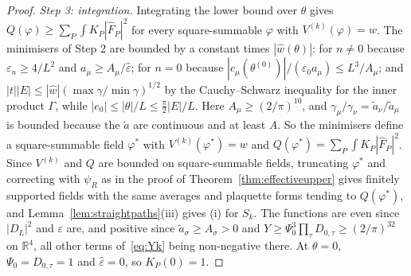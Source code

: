 \documentclass[11pt]{amsart}
\theoremstyle{definition}
\theoremstyle{remark}
\numberwithin{equation}{section}
\newcommand{\R}{\mathbb{R}}
\begin{document}
\begin{proof}
\emph{Step 3: integration.} Integrating the lower bound over $\theta$ gives
$Q(\varphi)\ge\sum_P\int K_P|\hat F_P|^2$ for every square-summable
$\varphi$ with $V^{(k)}(\varphi)=w$. The minimisers of Step 2 are bounded by
a constant times $|\hat w(\theta)|$: for $n\ne0$ because $\varepsilon_n\ge
4/L^2$ and $a_\mu\ge A_\mu/\hat\varepsilon$; for $n=0$ because
$|c_\mu(\theta^{(0)})|/(\varepsilon_0a_\mu)\le L^3/A_\mu$; and $|t||E|\le
|\hat w|(\max\gamma/\min\gamma)^{1/2}$ by the Cauchy--Schwarz inequality for
the inner product $\Gamma$, while $|e_0|\le|\theta|/L\le\frac\pi2|E|/L$.
Here $A_\mu\ge(2/\pi)^{10}$, and $\gamma_\mu/\gamma_\nu=\tilde a_\nu/
\tilde a_\mu$ is bounded because the $\tilde a$ are continuous and at least
$A$. So the minimisers define a square-summable field $\varphi^*$ with
$V^{(k)}(\varphi^*)=w$ and $Q(\varphi^*)=\sum_P\int K_P|\hat F_P|^2$.
Since $V^{(k)}$ and $Q$ are bounded on square-summable fields, truncating
$\varphi^*$ and correcting with $\psi_R$ as in the proof of
Theorem~\ref{thm:effectiveupper} gives finitely supported fields with the
same averages and plaquette forms tending to $Q(\varphi^*)$, and
Lemma~\ref{lem:straightpaths}(iii) gives (i) for $S_k$. The functions are
even since $|D_L|^2$ and $\varepsilon$ are, and positive since $\tilde
a_\sigma\ge A_\sigma>0$ and $Y\ge\Psi_0^3\prod_\tau D_{0,\tau}\ge
(2/\pi)^{32}$ on $\R^4$, all other terms of~\eqref{eq:Yk} being non-negative
there. At $\theta=0$, $\Psi_0=D_{0,\tau}=1$ and $\hat\varepsilon=0$, so
$K_P(0)=1$.


\end{proof}
\end{document}
